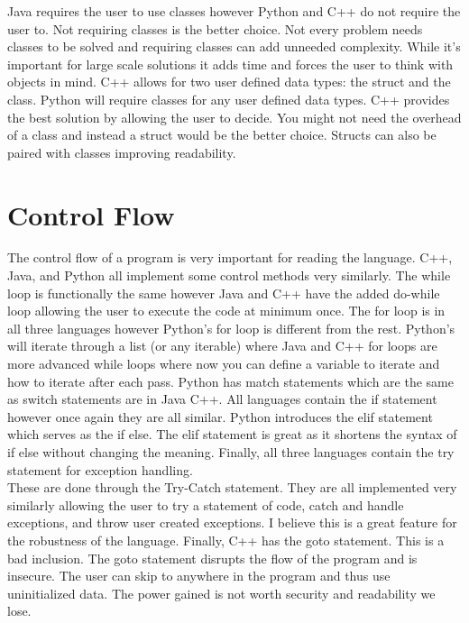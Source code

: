 \documentclass[sigconf, nonacm, authorversion, language=english, 12pt]{acmart}
\def\tab{\hspace*{5mm}}
\begin{document}
\tab Java requires the user to use classes however Python and C++ do not require the user to. Not requiring classes is the better choice. Not every problem needs classes to be solved and requiring
classes can add unneeded complexity. While it's important for large scale solutions it adds time and forces the user to think with objects in mind. C++ allows for two user defined data types: the struct
and the class. Python will require classes for any user defined data types. C++ provides the best solution by allowing the user to decide. You might not need the overhead of a class and instead a struct
would be the better choice. Structs can also be paired with classes improving readability.\\

\section{Control Flow}
\tab The control flow of a program is very important for reading the language. C++, Java, and Python all implement some control methods very similarly. The while loop is functionally the same however Java and C++
have the added do-while loop allowing the user to execute the code at minimum once. The for loop is in all three languages however Python's for loop is different from the rest. Python's will iterate through a list (or any iterable)
where Java and C++ for loops are more advanced while loops where now you can define a variable to iterate and how to iterate after each pass. Python has match statements which are the same as switch statements are in Java
C++. All languages contain the if statement however once again they are all similar. Python introduces the elif statement which serves as the if else. The elif statement is great as it shortens the syntax of if else without
changing the meaning. Finally, all three languages contain the try statement for exception handling.\\

\tab These are done through the Try-Catch statement. They are all implemented very similarly allowing the user to try a statement of code, catch and handle
exceptions, and throw user created exceptions. I believe this is a great feature for the robustness of the language. Finally, C++ has the goto statement.
This is a bad inclusion. The goto statement disrupts the flow of the program
and is insecure. The user can skip to anywhere in the program and thus use uninitialized data. The power gained is not worth security and readability we lose.\\
\end{document}
